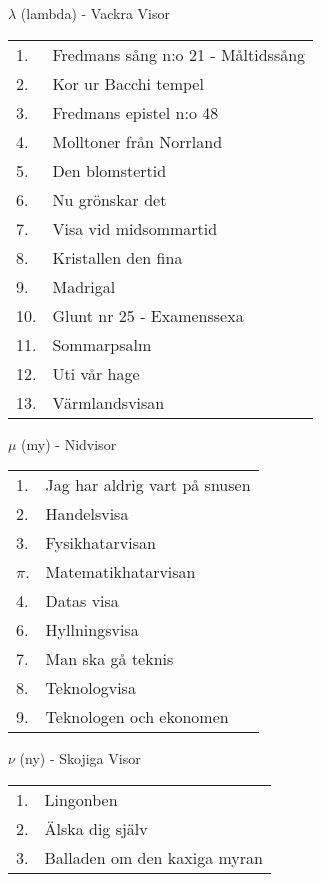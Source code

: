 \documentclass[a6paper,10pt]{article}
\begin{document}
\newpage

\noindent \Large $\lambda$ (lambda) - Vackra Visor

\noindent
\normalsize
\begin{tabularx}{1\textwidth}{l X}
1.&Fredmans sång n:o 21 - Måltidssång\\
2.&Kor ur Bacchi tempel\\
3.&Fredmans epistel n:o 48\\
4.&Molltoner från Norrland\\
5.&Den blomstertid\\
6.&Nu grönskar det \\
7.&Visa vid midsommartid\\
8.&Kristallen den fina\\
9.&Madrigal\\
10.&Glunt nr 25 - Examenssexa\\
11.&Sommarpsalm\\
12.&Uti vår hage\\
13.&Värmlandsvisan
\end{tabularx}

\vspace{5pt}

\noindent \Large $\mu$ (my) - Nidvisor

\noindent
\normalsize
\begin{tabularx}{1\textwidth}{l X}
1.&Jag har aldrig vart på snusen\\
2.&Handelsvisa\\
3.&Fysikhatarvisan\\
$\pi$.&Matematikhatarvisan\\
4.&Datas visa\\
6.&Hyllningsvisa\\
7.&Man ska gå teknis \\
8.&Teknologvisa\\
9.&Teknologen och ekonomen
\end{tabularx}

\vspace{5pt}

\noindent \Large $\nu$ (ny) - Skojiga Visor

\noindent
\normalsize
\begin{tabularx}{1\textwidth}{l X}
1.&Lingonben\\
2.&Älska dig själv\\
3.&Balladen om den kaxiga myran\\
\end{tabularx}
\end{document}
